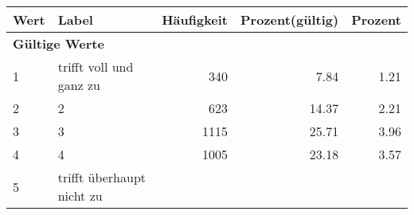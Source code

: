      \begin{longtable}{lXrrr}
     \toprule
     \textbf{Wert} & \textbf{Label} & \textbf{Häufigkeit} & \textbf{Prozent(gültig)} & \textbf{Prozent} \\
     \endhead
     \midrule
     \multicolumn{5}{l}{\textbf{Gültige Werte}}\\

     1 &
     \multicolumn{1}{X}{ trifft voll und ganz zu   } &


       \num{340} &
       \num[round-mode=places,round-precision=2]{7,84} &
         \num[round-mode=places,round-precision=2]{1,21} \\

     2 &
     \multicolumn{1}{X}{ 2   } &


       \num{623} &
       \num[round-mode=places,round-precision=2]{14,37} &
         \num[round-mode=places,round-precision=2]{2,21} \\

     3 &
     \multicolumn{1}{X}{ 3   } &


       \num{1115} &
       \num[round-mode=places,round-precision=2]{25,71} &
         \num[round-mode=places,round-precision=2]{3,96} \\

     4 &
     \multicolumn{1}{X}{ 4   } &


       \num{1005} &
       \num[round-mode=places,round-precision=2]{23,18} &
         \num[round-mode=places,round-precision=2]{3,57} \\

     5 &
     \multicolumn{1}{X}{ trifft überhaupt nicht zu   } &



\end{longtable}
